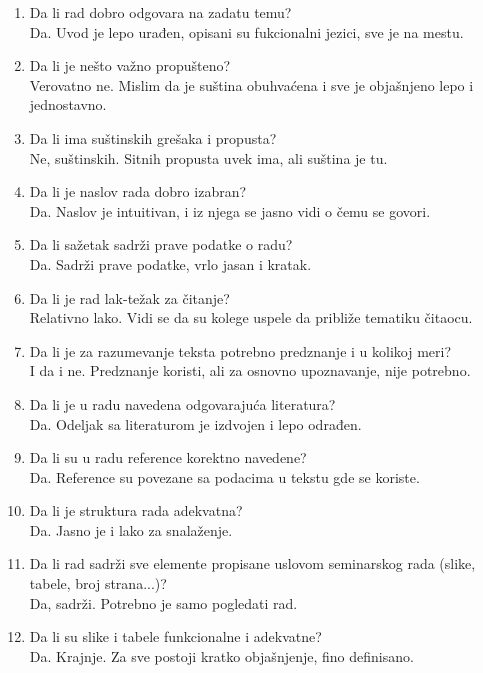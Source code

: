 \documentclass[a4paper]{report}
\begin{document}
\begin{enumerate}
\item Da li rad dobro odgovara na zadatu temu?\\
Da. Uvod je lepo urađen, opisani su fukcionalni jezici, sve je na mestu.

\item Da li je nešto važno propušteno?\\
Verovatno ne. Mislim da je suština obuhvaćena i sve je objašnjeno lepo i jednostavno.

\item Da li ima suštinskih grešaka i propusta?\\
Ne, suštinskih. Sitnih propusta uvek ima, ali suština je tu. 

\item Da li je naslov rada dobro izabran?\\
Da. Naslov je intuitivan, i iz njega se jasno vidi o čemu se govori.

\item Da li sažetak sadrži prave podatke o radu?\\
Da. Sadrži prave podatke, vrlo jasan i kratak. 

\item Da li je rad lak-težak za čitanje?\\
Relativno lako. Vidi se da su kolege uspele da približe tematiku čitaocu.

\item Da li je za razumevanje teksta potrebno predznanje i u kolikoj meri?\\
I da i ne. Predznanje koristi, ali za osnovno upoznavanje, nije potrebno.

\item Da li je u radu navedena odgovarajuća literatura?\\
Da. Odeljak sa literaturom je izdvojen i lepo odrađen.

\item Da li su u radu reference korektno navedene?\\
Da. Reference su povezane sa podacima u tekstu gde se koriste.

\item Da li je struktura rada adekvatna?\\
Da. Jasno je i lako za snalaženje.

\item Da li rad sadrži sve elemente propisane uslovom seminarskog rada (slike, tabele, broj strana...)?\\
Da, sadrži. Potrebno je samo pogledati rad. 

\item Da li su slike i tabele funkcionalne i adekvatne?\\
Da. Krajnje. Za sve postoji kratko objašnjenje, fino definisano.

\end{enumerate}
\end{document}

